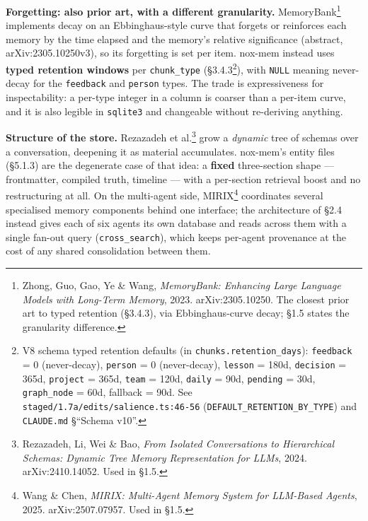 \documentclass[
]{article}
\begin{document}
\textbf{Forgetting: also prior art, with a different granularity.}
MemoryBank\footnote{Zhong, Guo, Gao, Ye \& Wang, \emph{MemoryBank:
  Enhancing Large Language Models with Long-Term Memory}, 2023.
  arXiv:2305.10250. The closest prior art to typed retention (§3.4.3),
  via Ebbinghaus-curve decay; §1.5 states the granularity difference.}
implements decay on an Ebbinghaus-style curve that forgets or reinforces
each memory by the time elapsed and the memory's relative significance
(abstract, arXiv:2305.10250v3), so its forgetting is set per item.
nox-mem instead uses \textbf{typed retention windows} per
\texttt{chunk\_type} (§3.4.3\footnote{V8 schema typed retention defaults
  (in \texttt{chunks.retention\_days}): \texttt{feedback} = 0
  (never-decay), \texttt{person} = 0 (never-decay), \texttt{lesson} =
  180d, \texttt{decision} = 365d, \texttt{project} = 365d, \texttt{team}
  = 120d, \texttt{daily} = 90d, \texttt{pending} = 30d,
  \texttt{graph\_node} = 60d, fallback = 90d. See
  \texttt{staged/1.7a/edits/salience.ts:46-56}
  (\texttt{DEFAULT\_RETENTION\_BY\_TYPE}) and \texttt{CLAUDE.md}
  §``Schema v10''.}), with \texttt{NULL} meaning never-decay for the
\texttt{feedback} and \texttt{person} types. The trade is expressiveness
for inspectability: a per-type integer in a column is coarser than a
per-item curve, and it is also legible in \texttt{sqlite3} and
changeable without re-deriving anything.

\textbf{Structure of the store.} Rezazadeh et al.\footnote{Rezazadeh,
  Li, Wei \& Bao, \emph{From Isolated Conversations to Hierarchical
  Schemas: Dynamic Tree Memory Representation for LLMs}, 2024.
  arXiv:2410.14052. Used in §1.5.} grow a \emph{dynamic} tree of schemas
over a conversation, deepening it as material accumulates. nox-mem's
entity files (§5.1.3) are the degenerate case of that idea: a
\textbf{fixed} three-section shape --- frontmatter, compiled truth,
timeline --- with a per-section retrieval boost and no restructuring at
all. On the multi-agent side, MIRIX\footnote{Wang \& Chen, \emph{MIRIX:
  Multi-Agent Memory System for LLM-Based Agents}, 2025.
  arXiv:2507.07957. Used in §1.5.} coordinates several specialised
memory components behind one interface; the architecture of §2.4 instead
gives each of six agents its own database and reads across them with a
single fan-out query (\texttt{cross\_search}), which keeps per-agent
provenance at the cost of any shared consolidation between them.
\end{document}
